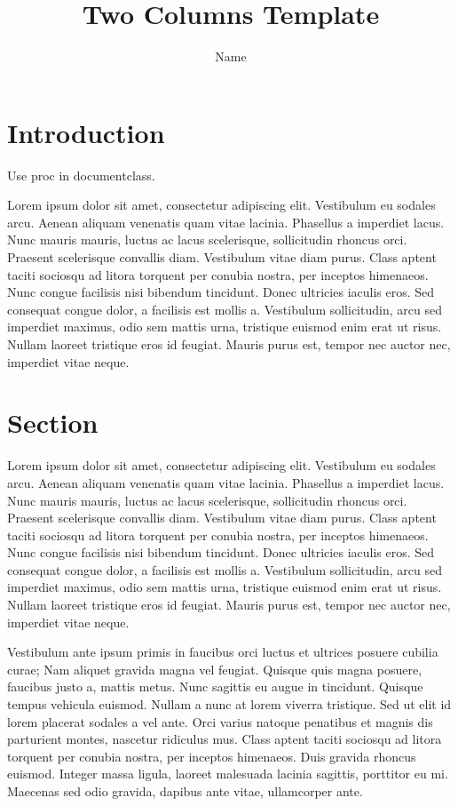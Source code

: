 \documentclass{proc}
\title{Two Columns Template}
\author{Name}
\date{}
\begin{document}
\maketitle
\section{Introduction}

Use proc in documentclass.

Lorem ipsum dolor sit amet, consectetur adipiscing elit. Vestibulum eu sodales arcu. Aenean aliquam venenatis quam vitae lacinia. Phasellus a imperdiet lacus. Nunc mauris mauris, luctus ac lacus scelerisque, sollicitudin rhoncus orci. Praesent scelerisque convallis diam. Vestibulum vitae diam purus. Class aptent taciti sociosqu ad litora torquent per conubia nostra, per inceptos himenaeos. Nunc congue facilisis nisi bibendum tincidunt. Donec ultricies iaculis eros. Sed consequat congue dolor, a facilisis est mollis a. Vestibulum sollicitudin, arcu sed imperdiet maximus, odio sem mattis urna, tristique euismod enim erat ut risus. Nullam laoreet tristique eros id feugiat. Mauris purus est, tempor nec auctor nec, imperdiet vitae neque.

\section{Section}
Lorem ipsum dolor sit amet, consectetur adipiscing elit. Vestibulum eu sodales arcu. Aenean aliquam venenatis quam vitae lacinia. Phasellus a imperdiet lacus. Nunc mauris mauris, luctus ac lacus scelerisque, sollicitudin rhoncus orci. Praesent scelerisque convallis diam. Vestibulum vitae diam purus. Class aptent taciti sociosqu ad litora torquent per conubia nostra, per inceptos himenaeos. Nunc congue facilisis nisi bibendum tincidunt. Donec ultricies iaculis eros. Sed consequat congue dolor, a facilisis est mollis a. Vestibulum sollicitudin, arcu sed imperdiet maximus, odio sem mattis urna, tristique euismod enim erat ut risus. Nullam laoreet tristique eros id feugiat. Mauris purus est, tempor nec auctor nec, imperdiet vitae neque.

Vestibulum ante ipsum primis in faucibus orci luctus et ultrices posuere cubilia curae; Nam aliquet gravida magna vel feugiat. Quisque quis magna posuere, faucibus justo a, mattis metus. Nunc sagittis eu augue in tincidunt. Quisque tempus vehicula euismod. Nullam a nunc at lorem viverra tristique. Sed ut elit id lorem placerat sodales a vel ante. Orci varius natoque penatibus et magnis dis parturient montes, nascetur ridiculus mus. Class aptent taciti sociosqu ad litora torquent per conubia nostra, per inceptos himenaeos. Duis gravida rhoncus euismod. Integer massa ligula, laoreet malesuada lacinia sagittis, porttitor eu mi. Maecenas sed odio gravida, dapibus ante vitae, ullamcorper ante.
\end{document}
